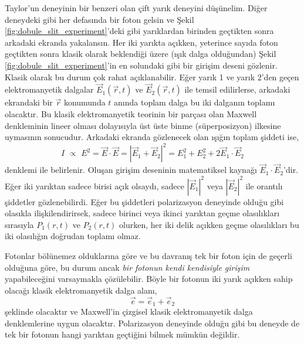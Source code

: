 \documentclass[a4paper,12pt, twoside]{article}
\begin{document}
Taylor'un deneyinin bir benzeri olan çift yarık deneyini düşünelim. Diğer deneydeki gibi her defasında bir foton gelsin ve Şekil \ref{fig:dobule_slit_experiment}'deki gibi yarıklardan birinden geçtikten sonra arkadaki ekranda yakalansın. Her iki yarıkta açıkken, yeterince sayıda foton geçtikten sonra klasik olarak beklendiği üzere (ışık dalga olduğundan) Şekil \ref{fig:dobule_slit_experiment}'in en solundaki gibi bir girişim deseni gözlenir. Klasik olarak bu durum çok rahat açıklanabilir. Eğer yarık 1 ve yarık 2'den geçen elektromanyetik dalgalar $\vec E_1(\vec r, t)$ ve $\vec E_2(\vec r, t)$ ile temsil edilirlerse, arkadaki ekrandaki bir $\vec r$ konumunda $t$ anında toplam dalga bu iki dalganın toplamı olacaktır. Bu klasik elektromanyetik teorinin bir parçası olan Maxwell denkleminin lineer olması dolayısıyla üst üste binme (süperposizyon) ilkesine uymasının sonucudur. Arkadaki ekranda gözlenecek olan ışığın toplam şiddeti ise,
\begin{equation}
I \,\, \propto\,\, E^2 = \vec E \cdot \vec E = |\vec E_1 + \vec E_2|^2 = E_1^2 + E_2^2 + 2\vec E_1 \cdot \vec E_2
\label{eq:foton_interference}
\end{equation}
denklemi ile belirlenir. Oluşan girişim deseninin matematiksel kaynağı $\vec E_1 \cdot \vec E_2$'dir. Eğer iki yarıktan sadece birisi açık olsaydı, sadece $|\vec E_1|^2$ veya $|\vec E_2|^2$ ile orantılı şiddetler gözlenebilirdi. Eğer bu şiddetleri polarizasyon deneyinde olduğu gibi olasıkla ilişkilendirirsek, sadece birinci veya ikinci yarıktan geçme olasılıkları sırasıyla $P_1(r,t)$ ve $P_2(r,t)$ olurken, her iki delik açıkken geçme olasılıkları bu iki olasılığın doğrudan toplamı olmaz.

Fotonlar bölünemez olduklarına göre ve bu davranış tek bir foton için de geçerli olduğuna göre, bu durum ancak \emph{bir fotonun kendi kendisiyle girişim} yapabileceğini varsaymakla çözülebilir. Böyle bir fotonun iki yarık açıkken sahip olacağı klasik elektromanyetik dalga alanı,
\begin{equation}
\vec e = \vec e_1 + \vec e_2
\label{eq:single_foton_em_field}
\end{equation}
şeklinde olacaktır ve Maxwell'in çizgisel klasik elektromanyetik dalga denklemlerine uygun olacaktır. Polarizasyon deneyinde olduğu gibi bu deneyde de tek bir fotonun hangi yarıktan geçtiğini bilmek mümkün değildir.
\end{document}
